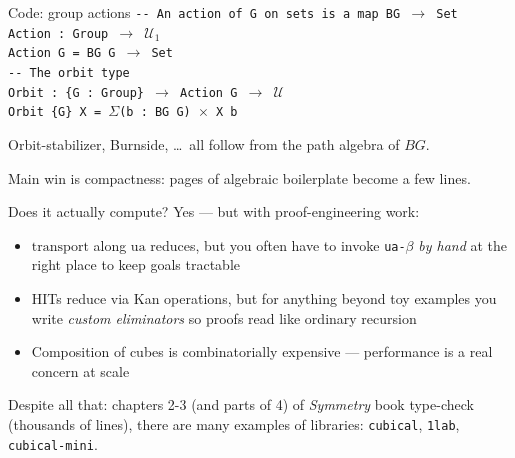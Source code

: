 \documentclass[aspectratio=169,12pt]{beamer}
\newcommand{\transp}{\mathrm{transport}}
\newcommand{\ua}{\mathrm{ua}}
\newcommand{\BG}{B\!G}
\begin{document}
\begin{frame}{Code: group actions}
  \texttt{-{}- An action of G on sets is a map BG }$\to$\texttt{ Set}\\
  \texttt{Action : Group }$\to$\texttt{ }$\mathcal{U}_1$\\
  \texttt{Action G = BG G }$\to$\texttt{ Set}\\[6pt]
  \texttt{-{}- The orbit type}\\
  \texttt{Orbit : \{G : Group\} }$\to$\texttt{ Action G }$\to$\texttt{ }$\mathcal{U}$\\
  \texttt{Orbit \{G\} X = }$\Sigma$\texttt{(b : BG G) }$\times$\texttt{ X b}
  \pause\medskip

  Orbit-stabilizer, Burnside, \ldots\ all follow from
  the path algebra of $\BG$.

  \pause\medskip
  Main win is compactness: pages of algebraic boilerplate become a few lines.
\end{frame}

\begin{frame}{Does it actually compute?}
  Yes --- but with proof-engineering work:
  \begin{itemize}
    \item $\transp$ along $\ua$ reduces, but you often have to invoke
          \texttt{ua-}$\beta$ \emph{by hand} at the right place to keep
          goals tractable
    \item HITs reduce via Kan operations, but for anything beyond toy
          examples you write \emph{custom eliminators} so proofs read
          like ordinary recursion
    \item Composition of cubes is combinatorially expensive ---
          performance is a real concern at scale
  \end{itemize}
  \pause\medskip
  Despite all that: chapters 2-3 (and parts of 4) of \emph{Symmetry} book type-check
  (thousands of lines), there are many examples of libraries: \texttt{cubical}, \texttt{1lab}, \texttt{cubical-mini}.
\end{frame}
\end{document}
